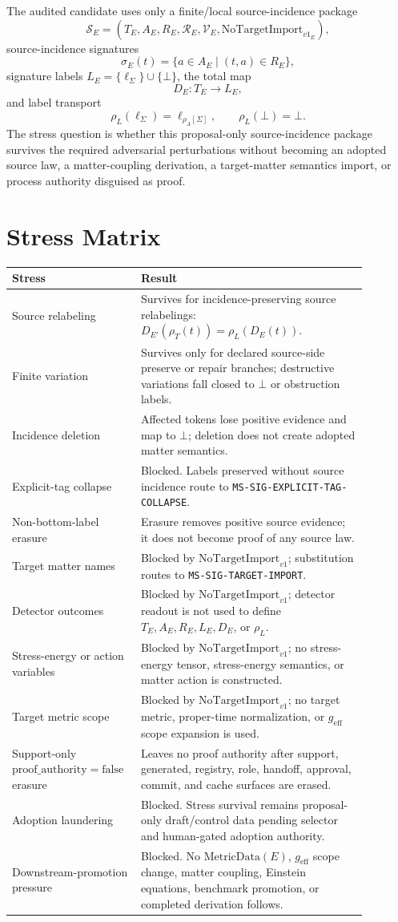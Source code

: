\documentclass[11pt]{article}
\newcommand{\MetricData}{\mathrm{MetricData}}
\newcommand{\geff}{g_{\mathrm{eff}}}
\newcommand{\Bottom}{\bot}
\newcommand{\NoTarget}{\mathrm{NoTargetImport}_{v1}}
\newcommand{\ProofAuthFalse}{\mathrm{proof\_authority=false}}
\begin{document}
The audited candidate uses only a finite/local source-incidence package
\[
  \mathcal{S}_E=(T_E,A_E,R_E,\mathcal{R}_E,\mathcal{V}_E,\NoTarget_E),
\]
source-incidence signatures
\[
  \sigma_E(t)=\{a\in A_E\mid (t,a)\in R_E\},
\]
signature labels \(L_E=\{\ell_\Sigma\}\cup\{\Bottom\}\), the total map
\[
  D_E:T_E\to L_E,
\]
and label transport
\[
  \rho_L(\ell_\Sigma)=\ell_{\rho_A[\Sigma]},
  \qquad \rho_L(\Bottom)=\Bottom.
\]
The stress question is whether this proposal-only source-incidence package
survives the required adversarial perturbations without becoming an adopted
source law, a matter-coupling derivation, a target-matter semantics import, or
process authority disguised as proof.

\section{Stress Matrix}

\begin{longtable}{p{0.28\linewidth}p{0.60\linewidth}}
\toprule
Stress & Result \\
\midrule
Source relabeling & Survives for incidence-preserving source relabelings:
\(D_{E'}(\rho_T(t))=\rho_L(D_E(t))\). \\
Finite variation & Survives only for declared source-side preserve or repair
branches; destructive variations fall closed to \(\Bottom\) or obstruction
labels. \\
Incidence deletion & Affected tokens lose positive evidence and map to
\(\Bottom\); deletion does not create adopted matter semantics. \\
Explicit-tag collapse & Blocked. Labels preserved without source incidence
route to \texttt{MS-SIG-EXPLICIT-TAG-COLLAPSE}. \\
Non-bottom-label erasure & Erasure removes positive source evidence; it does
not become proof of any source law. \\
Target matter names & Blocked by \(\NoTarget\); substitution routes to
\texttt{MS-SIG-TARGET-IMPORT}. \\
Detector outcomes & Blocked by \(\NoTarget\); detector readout is not used to
define \(T_E,A_E,R_E,L_E,D_E\), or \(\rho_L\). \\
Stress-energy or action variables & Blocked by \(\NoTarget\); no stress-energy
tensor, stress-energy semantics, or matter action is constructed. \\
Target metric scope & Blocked by \(\NoTarget\); no target metric, proper-time
normalization, or \(\geff\) scope expansion is used. \\
Support-only \(\ProofAuthFalse\) erasure & Leaves no proof authority after
support, generated, registry, role, handoff, approval, commit, and cache
surfaces are erased. \\
Adoption laundering & Blocked. Stress survival remains proposal-only
draft/control data pending selector and human-gated adoption authority. \\
Downstream-promotion pressure & Blocked. No \(\MetricData(E)\), \(\geff\)
scope change, matter coupling, Einstein equations, benchmark promotion, or
completed derivation follows. \\
\bottomrule
\end{longtable}
\end{document}
